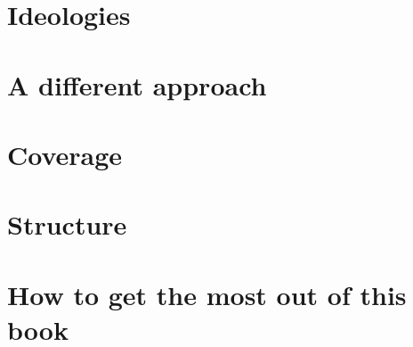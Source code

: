 \documentclass[../OpenAppliedMusicTheory.tex]{subfiles}
\begin{document}
    


    \section*{Ideologies}

    \section*{A different approach}

    \section*{Coverage}

    \section*{Structure}

    \section*{How to get the most out of this book}
\end{document}
